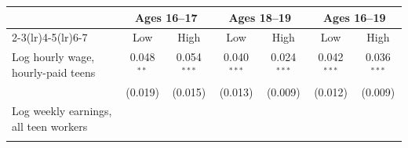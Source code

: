\begin{tabular}{lcccccc}
\toprule
 & \multicolumn{2}{c}{Ages 16--17} & \multicolumn{2}{c}{Ages 18--19} & \multicolumn{2}{c}{Ages 16--19} \\
\cmidrule(lr){2-3}\cmidrule(lr){4-5}\cmidrule(lr){6-7}
 & Low & High & Low & High & Low & High \\
\midrule
Log hourly wage, hourly-paid teens & 0.048$^{**}$ & 0.054$^{***}$ & 0.040$^{***}$ & 0.024$^{***}$ & 0.042$^{***}$ & 0.036$^{***}$ \\
 & (0.019) & (0.015) & (0.013) & (0.009) & (0.012) & (0.009) \\
Log weekly earnings, all teen workers &  &  &  &  &  &  \\
 &  &  &  &  &  &  \\
\bottomrule
\end{tabular}
